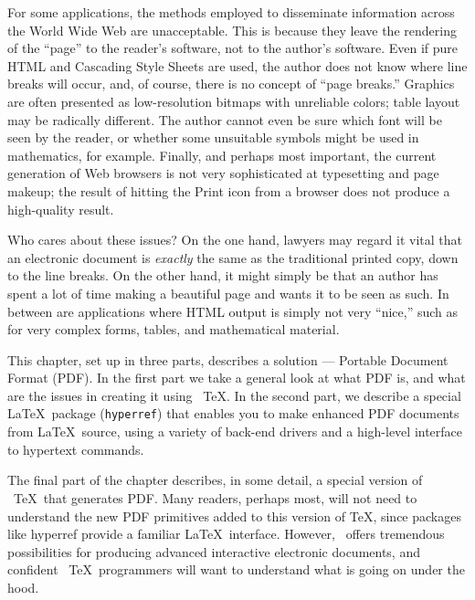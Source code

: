  

For some applications, the methods employed to disseminate information
across the World Wide Web are unacceptable. This is because they leave
the rendering of the ``page'' to the reader's software, not to the
author's software. Even if pure HTML and Cascading Style Sheets are
used, the author does not know where line breaks will occur, and, of
course, there is no concept of ``page breaks.'' Graphics are often
presented as low-resolution bitmaps with unreliable colors; table layout
may be radically different. The author cannot even be sure which font
will be seen by the reader, or whether some unsuitable symbols might be
used in mathematics, for example. Finally, and perhaps most important,
the current generation of Web browsers is not very sophisticated at
typesetting and page makeup; the result of hitting the Print icon from a
browser does not produce a high-quality result. 

Who cares about these issues? On the one hand, lawyers may regard it vital that 
an electronic document is \emph{exactly} the same as the traditional printed copy, down to 
the line breaks. On the other hand, it might simply be that an author has spent 
a lot of time making a beautiful page and wants it to be seen as such. In between 
are applications where HTML output is simply not very ``nice,'' such as for very 
complex forms, tables, and mathematical material. 

This chapter, set up in three parts, describes a solution --- Portable
Document Format (PDF). In the first part we take a general look at what
PDF is, and what are the issues in creating it using \ \TeX. In the
second part, we describe a special \LaTeX\ package (\verb|hyperref|) that
enables you to make enhanced PDF documents from \LaTeX\  source, using a
variety of back-end drivers and a high-level interface to hypertext
commands.  

The final part of the chapter describes, in some detail, a special
version of \ \TeX\ that generates PDF. Many readers, perhaps most, will
not need to understand the new PDF primitives added to this version of 
\TeX, since packages like hyperref provide a familiar \LaTeX\ interface.
However, \pdfTEX\ offers tremendous possibilities for producing advanced
interactive electronic documents, and confident \ \TeX\ programmers will
want to understand what is going on under the hood. 

